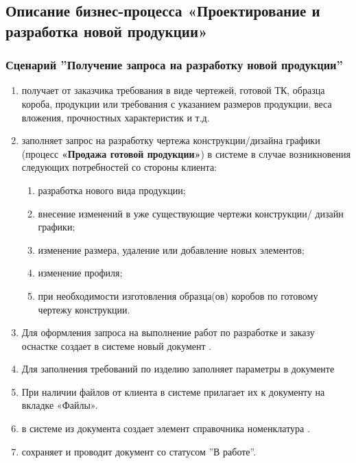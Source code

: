 
\subsection{Описание бизнес-процесса «Проектирование и разработка новой продукции»}

\subsubsection{Сценарий ''Получение запроса на разработку новой продукции''}
\label{bp:pm_1}

\begin{enumerate}

\item \manager получает от заказчика требования в виде чертежей, готовой ТК, образца короба, продукции или требования с указанием размеров продукции, веса вложения, прочностных характеристик и т.д.
\item \manager заполняет запрос на разработку чертежа конструкции/дизайна графики (процесс \textbf{«Продажа готовой продукции»}) в системе \gofro в случае возникновения следующих потребностей со стороны клиента:
    
    \begin{enumerate}
        \item разработка нового вида продукции;
        \item внесение изменений в уже существующие чертежи конструкции/ дизайн графики;
\item изменение размера, удаление или добавление новых элементов;
\item изменение профиля;
\item при необходимости изготовления образца(ов) коробов по готовому чертежу конструкции.
    \end{enumerate}


\item	Для оформления запроса на выполнение работ по разработке и заказу оснастке \manager  создает в системе \gofro новый документ .
\item Для заполнения требований по изделию \manager заполняет параметры в документе 
\item	При наличии файлов от клиента \manager в системе \gofro прилагает их к документу  на вкладке «Файлы».
\item	\manager в системе \gofro из документа создает элемент справочника номенклатура .
\item \manager сохраняет и проводит документ   со статусом ''В работе''.





\end{enumerate}

